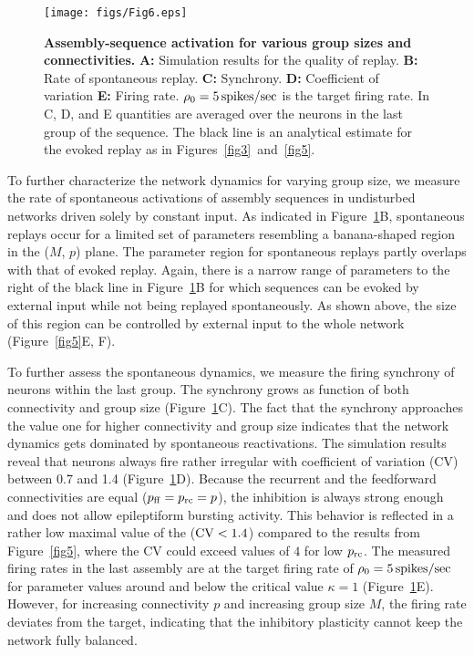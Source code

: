    \begin{figure}[!h]
      \center
      \texttt{[image: figs/Fig6.eps]}
      \caption{{\bf Assembly-sequence activation for various group sizes and
        connectivities.}
        \textbf{A:} Simulation results for the quality of replay.
        \textbf{B:} Rate of spontaneous replay.
        \textbf{C:} Synchrony.
        \textbf{D:} Coefficient of variation 
        \textbf{E:} Firing rate. $\rho_0=5 \,\rm spikes/sec$ is the target firing
        rate. In C, D, and E quantities are averaged over the neurons in the last
        group of the sequence. The black line is an analytical estimate for the
        evoked replay as in Figures~\ref{fig3}~and~\ref{fig5}.
      }
      \label{fig6}
    \end{figure}
    
    To further characterize the network dynamics for varying group size, we
    measure the rate of spontaneous activations of assembly sequences in
    undisturbed networks driven solely by constant input. As indicated in
    Figure~\ref{fig6}B, spontaneous replays occur for a limited set of parameters
    resembling a banana-shaped region in the ($M$, $p$) plane. The parameter
    region for spontaneous replays partly overlaps with that of evoked replay.
    Again, there is a narrow range of parameters to the right of the black line
    in Figure~\ref{fig6}B for which sequences can be evoked by external input
    while not being replayed spontaneously. As shown above, the size of this
    region can be controlled by external input to the whole network
    (Figure~\ref{fig5}E, F).

    To further assess the spontaneous dynamics, we measure the firing synchrony
    of neurons within the last group. The synchrony grows as function of both
    connectivity and group size (Figure~\ref{fig6}C). The fact that the synchrony
    approaches the value one for higher connectivity and group size indicates
    that the network dynamics gets dominated by spontaneous reactivations. The
    simulation results reveal that neurons always fire rather irregular with
    coefficient of variation (CV) between 0.7 and 1.4 (Figure~\ref{fig6}D).
    Because the recurrent and the feedforward connectivities are equal ($p_{\rm
    ff} = p_{\rm rc} = p$), the inhibition is always strong enough and does not
    allow epileptiform bursting activity. This behavior is reflected in a
    rather low maximal value of the ($\rm CV<1.4$) compared to the results from
    Figure~\ref{fig5}, where the CV could exceed values of $4$ for low $p_{\rm
    rc}$. The measured firing rates in the last assembly are at the target
    firing rate of $\rho_0=5 \, \rm spikes/sec$ for parameter values around and
    below the critical value $\kappa=1$ (Figure~\ref{fig6}E). However, for
    increasing connectivity $p$ and increasing group size $M$, the firing rate
    deviates from the target, indicating that the inhibitory plasticity cannot
    keep the network fully balanced.

